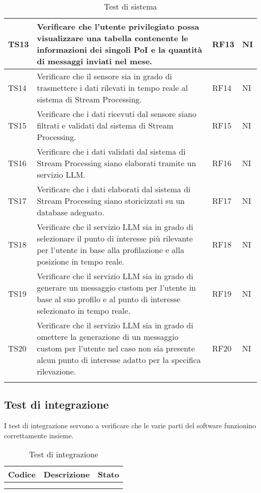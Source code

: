 \documentclass[10pt]{article}
\begin{document}
\begin{justify}
\begin{longtable}{|>{\centering\arraybackslash}m{2cm}|>{\centering\arraybackslash}m{7cm}|>{\centering\arraybackslash}m{2cm}|>{\centering\arraybackslash}m{2cm}|}
\hline
TS13 & Verificare che l'utente privilegiato possa visualizzare una tabella contenente le informazioni dei singoli PoI e la quantità di messaggi inviati nel mese. & RF13 & NI\\
\hline
TS14 & Verificare che il sensore sia in grado di trasmettere i dati rilevati in tempo reale al sistema di Stream Processing. & RF14 & NI\\
\hline
TS15 & Verificare che i dati ricevuti dal sensore siano filtrati e validati dal sistema di Stream Processing. & RF15 & NI\\
\hline
TS16 & Verificare che i dati validati dal sistema di Stream Processing siano elaborati tramite un servizio LLM. & RF16 & NI\\
\hline
TS17 & Verificare che i dati elaborati dal sistema di Stream Processing siano storicizzati su un database adeguato. & RF17 & NI\\
\hline
TS18 & Verificare che il servizio LLM sia in grado di selezionare il punto di interesse più rilevante per l'utente in base alla profilazione e alla posizione in tempo reale. & RF18 & NI\\
\hline
TS19 & Verificare che il servizio LLM sia in grado di generare un messaggio custom per l'utente in base al suo profilo e al punto di interesse selezionato in tempo reale. & RF19 & NI\\
\hline
TS20 & Verificare che il servizio LLM sia in grado di omettere la generazione di un messaggio custom per l'utente nel caso non sia presente alcun punto di interesse adatto per la specifica rilevazione. & RF20 & NI\\
\hline
\caption{Test di sistema}\\
\end{longtable}

\subsection{Test di integrazione}
I test di integrazione servono a verificare che le varie parti del software funzionino correttamente insieme.\\

\begin{longtable}{|>{\centering\arraybackslash}m{2cm}|>{\centering\arraybackslash}m{7cm}|>{\centering\arraybackslash}m{2cm}|}
\hline
\textbf{Codice} & \textbf{Descrizione} & \textbf{Stato}\\
\endhead
\hline
 & & \\
\hline
\caption{Test di integrazione}\\
\end{longtable}


\end{justify}
\end{document}
